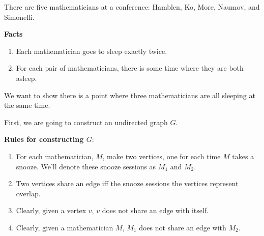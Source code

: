 \documentclass[fleqn]{article}
\begin{document}
There are five mathematicians at a conference: Hamblen, Ko, More, Naumov, and Simonelli.

\textbf{Facts}
\begin{enumerate}
  \item  Each mathematician goes to sleep exactly twice.

  \item  For each pair of mathematicians, there is some time where
         they are both asleep.
\end{enumerate}

We want to show there is a point where three mathematicians are all sleeping at the same time.

First, we are going to construct an undirected graph $G$.

\textbf{Rules for constructing $G$}:
\begin{enumerate}
  \item For each mathematician, $M$, make two vertices, one for each
        time $M$ takes a snooze. We'll denote these snooze sessions
        as $M_1$ and $M_2$.
  \item Two vertices share an edge iff the snooze sessions the vertices
        represent overlap.
  \item Clearly, given a vertex $v$, $v$ does not share an edge with
        itself.
  \item Clearly, given a mathematician $M$, $M_1$ does not share an
        edge with $M_2$.
\end{enumerate}
\end{document}
